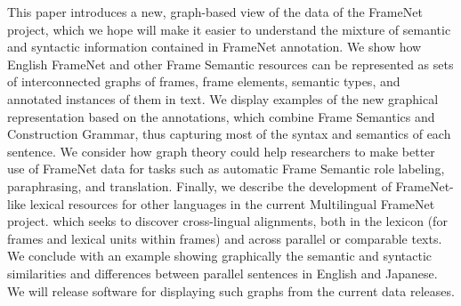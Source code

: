 This paper introduces a new, graph-based view of the data of the FrameNet project, which we hope will make it easier to understand the mixture of semantic and syntactic information contained in FrameNet annotation.  We show how English FrameNet and other Frame Semantic resources can be represented as sets of interconnected graphs of frames, frame elements, semantic types, and annotated instances of them in text.  We display examples of the new graphical representation based on the annotations, which combine Frame Semantics and Construction Grammar, thus capturing most of the syntax and semantics of each sentence.  We consider how graph theory could help researchers to make better use of FrameNet data for tasks such as automatic Frame Semantic role labeling, paraphrasing, and translation.              Finally, we describe the development of FrameNet-like lexical resources for other languages in the current Multilingual FrameNet project.  which seeks to discover cross-lingual alignments, both in the lexicon (for frames and lexical units within frames) and across parallel or comparable texts.  We conclude with an example showing graphically the semantic and syntactic similarities and differences between parallel sentences in English and Japanese.  We will release software for displaying such graphs from the current data releases.
